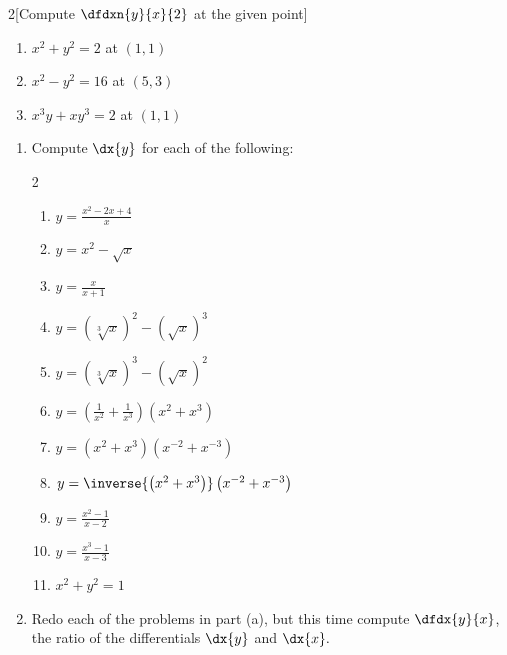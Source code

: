 \begin{ProblemSection}
  \begin{embeddedproblem}{}
    \begin{multicols}{2}[Compute $\dfdxn{y}{x}{2}$ at the given point]
      \begin{enumerate}
      \item $x^2+y^2=2$ at $(1,1)$
      \item $x^2-y^2=16$ at $(5,3)$
      \item $x^3y+xy^3=2$ at $(1,1)$
      \end{enumerate}
    \end{multicols}
  \end{embeddedproblem}

  \begin{embeddedproblem}{}
      \begin{enumerate}[label={\bf{}(\alph*)}]
      \item Compute $\dx{y}$ for each of the following:
        \begin{multicols}{2}
          \begin{enumerate}[label={\bf{}(\roman*)}]
          \item $ y=\frac{x^2-2x+4}{x}$
          \item $ y=x^2-\sqrt{x}$
          \item $ y=\frac{x}{x+1}$
          \item
            $ y=\left(\sqrt[3]{x}\right)^2-\left(\sqrt{x}\right)^3$
          \item
            $ y=\left(\sqrt[3]{x}\right)^3-\left(\sqrt{x}\right)^2$
          \item
            $
            y=\left(\frac{1}{x^2}+\frac{1}{x^3}\right)\left(x^2+x^3\right)$
          \item $ y=\left(x^2+x^3\right)\left(x^{-2}+x^{-3}\right)$
          \item
            $
            y=\inverse{\left(x^2+x^3\right)}\left(x^{-2}+x^{-3}\right)$
          \item $ y=\frac{x^2-1}{x-2}$
          \item $ y=\frac{x^3-1}{x-3}$
          \item $ x^2+y^2=1$
          \end{enumerate}
        \end{multicols}
      \item Redo each of the problems in part (a), but this time
        compute $\dfdx{y}{x}$, the ratio of the differentials $\dx{y}$ and
        $\dx{x}.$
      \end{enumerate}
    \end{embeddedproblem}


\end{ProblemSection}
